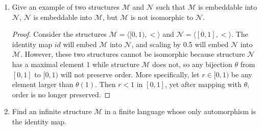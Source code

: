 \documentclass{article}
\begin{document}
\begin{enumerate}
\begin{enumerate}
      \item $\mathcal{M}=\langle\mathbb{N}\setminus\{0\},\cdot,1\rangle$ and
        $\mathcal{N}=\langle\mathbb{N},+,0\rangle$
        \begin{proof}
          No such embedding exists. Assume that an embedding
          $\alpha:\mathbb{N}\hookrightarrow\mathbb{N}$ exists. Since
          embeddings preserve function maps, we can prove by induction on
          $k$ that for any $n\in\mathbb{N}\setminus\{0\}$,
          $\alpha(n^k)=k\cdot \alpha(n)$.  Let $m=\alpha(2)$ and
          $n=\alpha(3)$. Note that $m\neq0$ and $n\neq0$ since
          $\alpha(1)=0$ and $\alpha$ is injective. Then $\alpha(2^n)=n\cdot
          m=m\cdot n=\alpha(3^m)$, yet $2^n\neq3^m$ since $m,n\neq0$,
          contradicting the injectiveness of $\alpha$.
        \end{proof}
    \end{enumerate}

  \item Give an example of two structures $\mathcal{M}$ and $\mathcal{N}$
    such that $\mathcal{M}$ is embeddable into $\mathcal{N}$, $\mathcal{N}$
    is embeddable into $\mathcal{M}$, but $\mathcal{M}$ is not isomorphic
    to $\mathcal{N}$.

    \begin{proof}
      Consider the structures $\mathcal{M}=\langle[0,1),<\rangle$ and
      $\mathcal{N}=\langle[0,1],<\rangle$. The identity map $id$ will embed
      $\mathcal{M}$ into $\mathcal{N}$, and scaling by 0.5 will embed
      $\mathcal{N}$ into $\mathcal{M}$. However, these two structures
      cannot be isomorphic because structure $\mathcal{N}$ has a maximal
      element 1 while structure $\mathcal{M}$ does not, so any bijection
      $\theta$ from $[0,1]$ to $[0,1)$ will not preserve order. More
      specifically, let $r\in[0,1)$ be any element larger than $\theta(1)$.
      Then $r<1$ in $[0,1]$, yet after mapping with $\theta$, order is no
      longer preserved.
    \end{proof}

  \item Find an infinite structure $\mathcal{M}$ in a finite language whose
    only automorphism is the identity map.


\end{enumerate}
\end{document}
